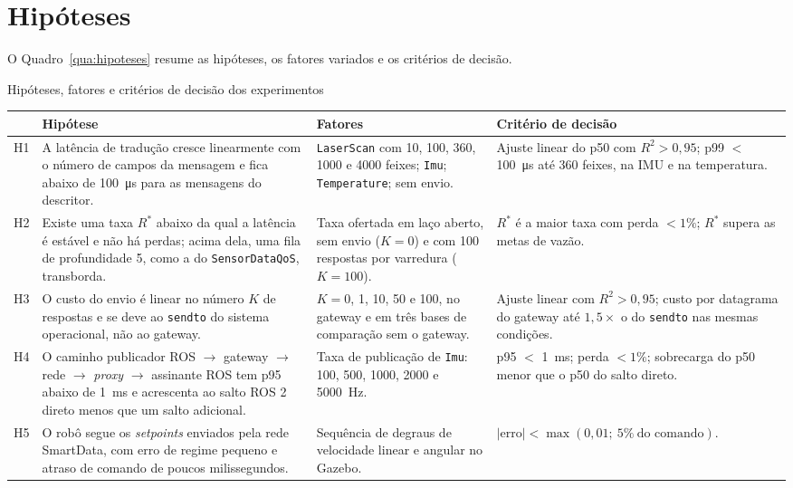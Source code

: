 \documentclass[
    12pt,
    oneside,
    a4paper,
    chapter=TITLE,
    section=TITLE,
    english,
    brazil
]{abntex2}
\begin{document}
\section{Hipóteses}
\label{sec:hipoteses}

O Quadro~\ref{qua:hipoteses} resume as hipóteses, os fatores variados e os
critérios de decisão.

\begin{quadro}[H]
\centering
\fontsize{10}{12}\selectfont
\caption{Hipóteses, fatores e critérios de decisão dos experimentos}
\label{qua:hipoteses}
\begin{tabularx}{\textwidth}{@{}p{}YYY@{}}
\toprule
& \textbf{Hipótese} & \textbf{Fatores} & \textbf{Critério de decisão} \\
\midrule
H1 & A latência de tradução cresce linearmente com o número de campos da
 mensagem e fica abaixo de \SI{100}{\micro\second} para as mensagens do
 descritor.
 & \texttt{LaserScan} com 10, 100, 360, \num{1000} e \num{4000} feixes;
 \texttt{Imu}; \texttt{Temperature}; sem envio.
 & Ajuste linear do p50 com $R^2 > 0{,}95$; p99 $<$
 \SI{100}{\micro\second} até 360 feixes, na IMU e na temperatura. \\
\addlinespace
H2 & Existe uma taxa $R^*$ abaixo da qual a latência é estável e não há
 perdas; acima dela, uma fila de profundidade 5, como a do
 \texttt{SensorDataQoS}, transborda.
 & Taxa ofertada em laço aberto, sem envio ($K = 0$) e com 100 respostas
 por varredura ($K = 100$).
 & $R^*$ é a maior taxa com perda $< 1\%$; $R^*$ supera as metas de vazão.
 \\
\addlinespace
H3 & O custo do envio é linear no número $K$ de respostas e se deve ao
 \texttt{sendto} do sistema operacional, não ao gateway.
 & $K = 0$, 1, 10, 50 e 100, no gateway e em três bases de comparação sem
 o gateway.
 & Ajuste linear com $R^2 > 0{,}95$; custo por datagrama do gateway até
 $1{,}5\times$ o do \texttt{sendto} nas mesmas condições. \\
\addlinespace
H4 & O caminho publicador ROS $\to$ gateway $\to$ rede $\to$
 \textit{proxy} $\to$ assinante ROS tem p95 abaixo de
 \SI{1}{\milli\second} e acrescenta ao salto ROS 2 direto menos que um
 salto adicional.
 & Taxa de publicação de \texttt{Imu}: 100, 500, \num{1000}, \num{2000} e
 \SI{5000}{\hertz}.
 & p95 $<$ \SI{1}{\milli\second}; perda $< 1\%$; sobrecarga do p50 menor
 que o p50 do salto direto. \\
\addlinespace
H5 & O robô segue os \textit{setpoints} enviados pela rede SmartData, com
 erro de regime pequeno e atraso de comando de poucos milissegundos.
 & Sequência de degraus de velocidade linear e angular no Gazebo.
 & $|\text{erro}| < \max(0{,}01;\ 5\%\ \text{do comando})$. \\
\bottomrule
\end{tabularx}
\end{quadro}
\end{document}
